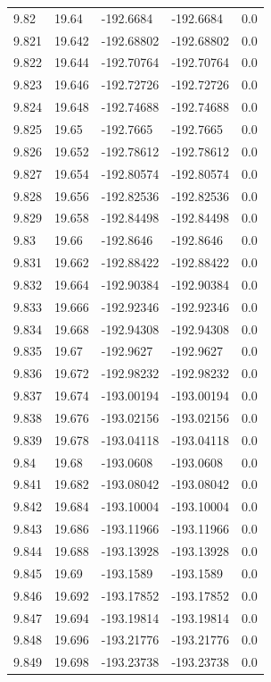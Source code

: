 \begin{tabular}{lllll}
9.82 & 19.64 & -192.6684 & -192.6684 & 0.0 \\
9.821 & 19.642 & -192.68802 & -192.68802 & 0.0 \\
9.822 & 19.644 & -192.70764 & -192.70764 & 0.0 \\
9.823 & 19.646 & -192.72726 & -192.72726 & 0.0 \\
9.824 & 19.648 & -192.74688 & -192.74688 & 0.0 \\
9.825 & 19.65 & -192.7665 & -192.7665 & 0.0 \\
9.826 & 19.652 & -192.78612 & -192.78612 & 0.0 \\
9.827 & 19.654 & -192.80574 & -192.80574 & 0.0 \\
9.828 & 19.656 & -192.82536 & -192.82536 & 0.0 \\
9.829 & 19.658 & -192.84498 & -192.84498 & 0.0 \\
9.83 & 19.66 & -192.8646 & -192.8646 & 0.0 \\
9.831 & 19.662 & -192.88422 & -192.88422 & 0.0 \\
9.832 & 19.664 & -192.90384 & -192.90384 & 0.0 \\
9.833 & 19.666 & -192.92346 & -192.92346 & 0.0 \\
9.834 & 19.668 & -192.94308 & -192.94308 & 0.0 \\
9.835 & 19.67 & -192.9627 & -192.9627 & 0.0 \\
9.836 & 19.672 & -192.98232 & -192.98232 & 0.0 \\
9.837 & 19.674 & -193.00194 & -193.00194 & 0.0 \\
9.838 & 19.676 & -193.02156 & -193.02156 & 0.0 \\
9.839 & 19.678 & -193.04118 & -193.04118 & 0.0 \\
9.84 & 19.68 & -193.0608 & -193.0608 & 0.0 \\
9.841 & 19.682 & -193.08042 & -193.08042 & 0.0 \\
9.842 & 19.684 & -193.10004 & -193.10004 & 0.0 \\
9.843 & 19.686 & -193.11966 & -193.11966 & 0.0 \\
9.844 & 19.688 & -193.13928 & -193.13928 & 0.0 \\
9.845 & 19.69 & -193.1589 & -193.1589 & 0.0 \\
9.846 & 19.692 & -193.17852 & -193.17852 & 0.0 \\
9.847 & 19.694 & -193.19814 & -193.19814 & 0.0 \\
9.848 & 19.696 & -193.21776 & -193.21776 & 0.0 \\
9.849 & 19.698 & -193.23738 & -193.23738 & 0.0 \\

\end{tabular}

